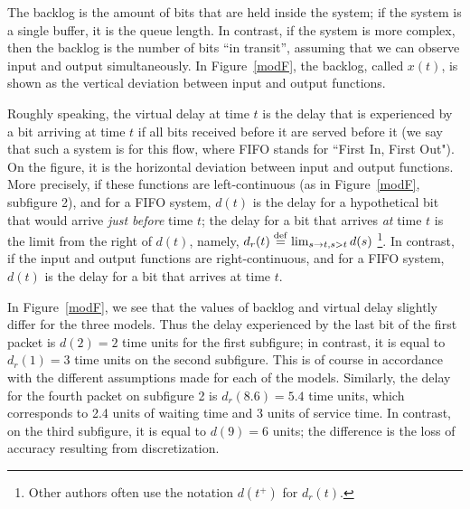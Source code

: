 The backlog is the amount of bits that are held inside the system;
if the system is a single buffer, it is the queue length. In
contrast, if the system is more complex, then the backlog is the
number of bits ``in transit'', assuming that we can observe input
and output simultaneously.  %
In
Figure~\ref{modF}, the backlog, called $x(t)$, is shown as the
vertical deviation between input and output functions.

Roughly speaking, the virtual delay at time $t$ is the
delay that is experienced by a bit arriving at time $t$ if
all bits received before it are served before it (we say that such a system is  for this flow, where FIFO stands for ``First In, First Out"). On the figure, it is the horizontal deviation
between input and output functions.  More precisely, if these functions %
%
are left-continuous (as in Figure~\ref{modF}, subfigure 2), and for a FIFO system, $d(t)$ is the delay for a  hypothetical bit that would arrive \emph{just before} time $t$; the delay for a bit that arrives \emph{at} time $t$ is the limit from the right of $d(t)$, namely, $d_r(t)\stackrel{\mathrm{def}}{=}\lim_{s \rightarrow t, s>t}d(s)$
\footnote{Other authors often use the
notation $d(t^+)$ for $d_r(t)$.}.
In contrast, if the input and output functions are right-continuous, and for a FIFO system, $d(t)$ is the delay for a bit that arrives at time $t$.

In Figure~\ref{modF}, we see that the values of backlog and
virtual delay slightly differ for the three models. Thus the delay
experienced by the last bit of the first packet is $d(2)=2$ time
units for the first subfigure; in contrast, it is equal to
$d_r(1)=3$ time units on the second subfigure. This is of course in
accordance with the different assumptions made for each of the
models. Similarly, the delay for the fourth packet on subfigure 2
is $d_r(8.6)=5.4$ time units, which corresponds to 2.4 units of
waiting time and 3 units of service time. In contrast, on the
third subfigure, it is equal to $d(9)=6$ units; the difference is
the loss of accuracy resulting from discretization.



